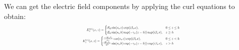 \documentclass[main.tex]{subfile}
\begin{document}
We can get the electric field components by applying the curl equations to obtain: 
\begin{equation}
\label{eq:ETM}
\resizebox{0.4\textwidth}{!}{$
\begin{aligned}
E^{(\nu)}_x(x,z)=
\begin{cases}
E_0 \sin(\kappa_\nu z)\exp(i \beta_\nu x),  &  0\leq z \leq h \\ 
E_0 \sin(\kappa_\nu h)\exp(-\gamma_\nu (z-h))\exp(i \beta_\nu x),  &  z \geq h
\end{cases}
\\
E^{(\nu)}_z(x,z)=
\begin{cases}
\frac{-i E_0 \beta_\nu}{\kappa_\nu} \cos(\kappa_\nu z)\exp(i \beta_\nu x),  &  0\leq z < h \\ 
\frac{i E_0 \beta_\nu}{n^2} \sin(\kappa_\nu h)\exp(-\gamma_\nu (z-h))\exp(i \beta_\nu x),  &  z > h
\end{cases}
\end{aligned}
$}
\end{equation}
\end{document}

